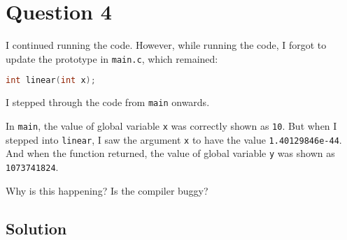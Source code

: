 \section*{Question 4}

I continued running the code.
However, while running the code, I forgot to update the prototype in \texttt{main.c}, which remained:
\begin{lstlisting}[language=C]
int linear(int x);
\end{lstlisting}

I stepped through the code from \texttt{main} onwards.

In \texttt{main}, the value of global variable \texttt{x} was correctly shown as \texttt{10}.
But when I stepped into \texttt{linear}, I saw the argument \texttt{x} to have the value \texttt{1.40129846e-44}.
And when the function returned, the value of global variable \texttt{y} was shown as \texttt{1073741824}.

Why is this happening?
Is the compiler buggy?

\subsection*{Solution}
